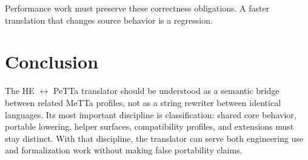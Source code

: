 \documentclass[11pt]{article}
\newcommand{\HE}{\textup{HE}}
\newcommand{\PeTTa}{\textup{PeTTa}}
\begin{document}
Performance work must preserve these correctness obligations.  A faster
translation that changes source behavior is a regression.

\section{Conclusion}

The \HE{} $\leftrightarrow$ \PeTTa{} translator should be understood as a
semantic bridge between related MeTTa profiles, not as a string rewriter between
identical languages.  Its most important discipline is classification: shared
core behavior, portable lowering, helper surfaces, compatibility profiles, and
extensions must stay distinct.  With that discipline, the translator can serve
both engineering use and formalization work without making false portability
claims.
\end{document}
